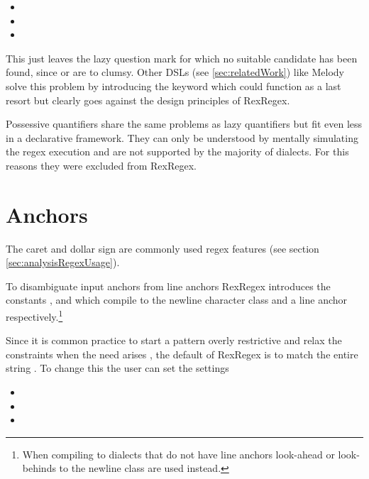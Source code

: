 \begin{itemize}
    \setlength\itemsep{0em}
    \vspace{-.7em}
    \item {}
    \item {} 
    \item {} 
    \vspace{-.7em}
\end{itemize}


This just leaves the lazy question mark  for which no suitable candidate has been found, since  or  are to clumsy. Other DSLs (see \ref{sec:relatedWork}) like Melody \cite{RegexDslMelody} solve this problem by introducing the  keyword which could function as a last resort but clearly goes against the design principles of RexRegex.

Possessive quantifiers share the same problems as lazy quantifiers but fit even less in a declarative framework. They can only be understood by mentally simulating the regex execution and are not supported by the majority of dialects. For this reasons they were excluded from RexRegex.

\section{Anchors} \label{sec:dslAnchors}

The caret \pattern{\caret} and dollar sign \pattern{\$} are commonly used regex features (see section \ref{sec:analysisRegexUsage}). 

To disambiguate input anchors from line anchors RexRegex introduces the constants ,  and  
which compile to the newline character class and a line anchor respectively.\footnote{When compiling to dialects that do not have line anchors look-ahead or look-behinds to the newline class are used instead.} 

Since it is common practice to start a pattern overly restrictive and relax the constraints when the need arises \cite{RegexesAreHard}, the default of RexRegex is to match the entire string \pattern{\caret\placeholder\dollar}. To change this the user can set the settings

\begin{itemize}
    \setlength\itemsep{0em}
    \vspace{-.7em}
    \item {}
    \item {}
    \item {}
    \vspace{-.7em}
\end{itemize}

